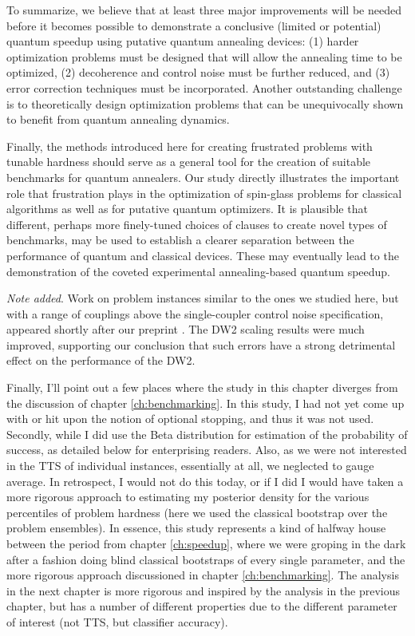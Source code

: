 To summarize, we believe that at least three major improvements will be needed before it becomes possible to demonstrate a conclusive (limited or potential) quantum speedup using putative quantum annealing devices: (1) harder optimization problems must be designed that will allow the annealing time to be optimized, (2) decoherence and control noise must be further reduced, and (3) error correction techniques must be incorporated. Another outstanding challenge is to theoretically design optimization problems that can be unequivocally shown to benefit from quantum annealing dynamics.

Finally, the methods introduced here for creating frustrated problems with tunable hardness should serve as a general tool for the creation of suitable benchmarks for quantum annealers. Our study directly illustrates the important role that frustration plays in the optimization of spin-glass problems for classical algorithms as well as for putative quantum optimizers. It is plausible that different, perhaps more finely-tuned choices of clauses to create novel types of benchmarks, may be used to establish a clearer separation between the performance of quantum and classical devices.
These may eventually lead to the demonstration of the coveted
experimental annealing-based quantum speedup.

\textit{Note added}. Work on problem instances similar to the ones we studied here, but with a range of couplings above the single-coupler control noise specification, appeared shortly after our preprint \cite{King:2015zr}. The DW2 scaling results were much improved, supporting our conclusion that such errors have a strong detrimental effect on the performance of the DW2.

Finally, I'll point out a few places where the study in this chapter diverges from the discussion of chapter \ref{ch:benchmarking}. In this study, I had not yet come up with or hit upon the notion of optional stopping, and thus it was not used. Secondly, while I did use the Beta distribution for estimation of the probability of success, as detailed below for enterprising readers. Also, as we were not interested in the TTS of individual instances, essentially at all, we neglected to gauge average. In retrospect, I would not do this today, or if I did I would have taken a more rigorous approach to estimating my posterior density for the various percentiles of problem hardness (here we used the classical bootstrap over the problem ensembles). In essence, this study represents a kind of halfway house between the period from chapter \ref{ch:speedup}, where we were groping in the dark after a fashion doing blind classical bootstraps of every single parameter, and the more rigorous approach discussioned in chapter \ref{ch:benchmarking}. The analysis in the next chapter is more rigorous and inspired by the analysis in the previous chapter, but has a number of different properties due to the different parameter of interest (not TTS, but classifier accuracy).

